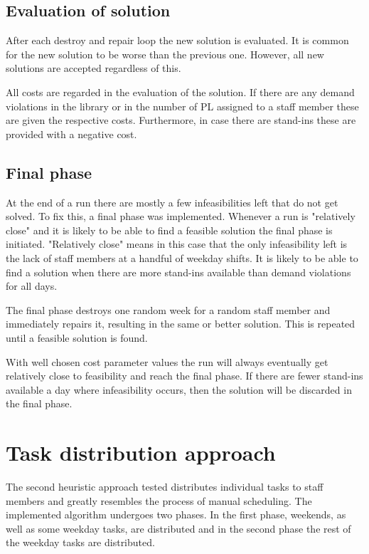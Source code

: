 \subsection{Evaluation of solution}
After each destroy and repair loop the new solution is evaluated. It is common for the new solution to be worse than the previous one. However, all new solutions are accepted regardless of this.

All costs are regarded in the evaluation of the solution. If there are any demand violations in the library or in the number of PL assigned to a staff member these are given the respective costs. Furthermore, in case there are stand-ins these are provided with a negative cost. 
\subsection{Final phase}
At the end of a run there are mostly a few infeasibilities left that do not get solved. To fix this, a final phase was implemented. Whenever a run is "relatively close" and it is likely to be able to find a feasible solution the final phase is initiated. "Relatively close" means in this case that the only infeasibility left is the lack of staff members at a handful of weekday shifts. It is likely to be able to find a solution when there are more stand-ins available than demand violations for all days.

The final phase destroys one random week for a random staff member and immediately repairs it, resulting in the same or better solution. This is repeated until a feasible solution is found. %

With well chosen cost parameter values the run will always eventually get relatively close to feasibility and reach the final phase. If there are fewer stand-ins available a day where infeasibility occurs, then the solution will be discarded in the final phase.

\section{Task distribution approach} \label{section:impl_task_dist}

The second heuristic approach tested distributes individual tasks to staff members and greatly resembles the process of manual scheduling. The implemented algorithm undergoes two phases. In the first phase, weekends, as well as some weekday tasks, are distributed and in the second phase the rest of the weekday tasks are distributed. 

